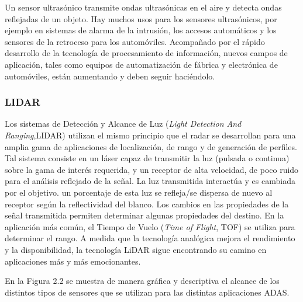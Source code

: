 Un sensor ultrasónico transmite ondas ultrasónicas en el aire y detecta ondas reflejadas de un objeto. Hay muchos usos para los sensores ultrasónicos, por ejemplo en sistemas de alarma de la intrusión, los accesos automáticos y los sensores de la retroceso para los automóviles. Acompañado por el rápido desarrollo de la tecnología de procesamiento de información, nuevos campos de aplicación, tales como equipos de automatización de fábrica y electrónica de automóviles, están aumentando y deben seguir haciéndolo\cite{Manual2008}.


\subsubsection{LIDAR}

Los sistemas de Detección y Alcance de Luz (\textit{Light Detection And Ranging},LIDAR) utilizan el mismo principio que el radar se desarrollan para una amplia gama de aplicaciones de localización, de rango y de generación de perfiles. Tal sistema consiste en un láser capaz de transmitir la luz (pulsada o continua) sobre la gama de interés requerida, y un receptor de alta velocidad, de poco ruido para el análisis reflejado de la señal. La luz transmitida interactúa y es cambiada por el objetivo. 
un porcentaje de esta luz se refleja/se dispersa de nuevo al receptor según la reflectividad del blanco. Los cambios en las propiedades de la señal transmitida permiten determinar algunas propiedades del destino. En la aplicación más común, el Tiempo de Vuelo (\textit{Time of Flight}, TOF) se utiliza para determinar el rango. A medida que la tecnología analógica mejora el rendimiento y la disponibilidad, la tecnología LiDAR sigue encontrando su camino en aplicaciones más y más emocionantes.\cite{Ha2015}


\begin{comment}

\subsubsection{Varios}

----Figura 1. pagina 50 Scanning LIDAR 0753.......------


---Table 1.A  A comparison........   page 51 Scanning LIDAR 0753.......------

-----Ver tabla 8 pagido 110 Embeddubg vision-based07921..pdf-----

\end{comment}

En la Figura 2.2 se muestra de manera gráfica y descriptiva el alcance de los distintos tipos de sensores que se utilizan para las distintas aplicaciones ADAS.


